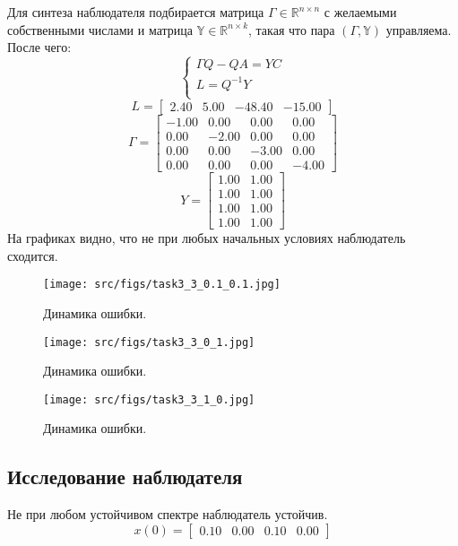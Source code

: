 Для синтеза наблюдателя подбирается матрица \(\Gamma \in \mathds{R}^{n \times n}\) с желаемыми собственными числами и матрица \(\mathds{Y} \in \mathds{R}^{n \times k}\), такая что пара \((\Gamma, \mathds{Y})\) управляема. После чего:
\[
    \begin{cases}
        \Gamma Q - QA = YC \\
        L = Q^{-1}Y \\
    \end{cases}
\]
\[L = \begin{bmatrix}
        2.40 &  5.00 & -48.40 & -15.00
      \end{bmatrix}\]
      \[\Gamma = \begin{bmatrix}
       -1.00 &  0.00 &  0.00 &  0.00\\
        0.00 & -2.00 &  0.00 &  0.00\\
        0.00 &  0.00 & -3.00 &  0.00\\
        0.00 &  0.00 &  0.00 & -4.00
      \end{bmatrix}\]
      \[Y = \begin{bmatrix}
        1.00 &  1.00\\
        1.00 &  1.00\\
        1.00 &  1.00\\
        1.00 &  1.00
      \end{bmatrix}\]
На графиках видно, что не при любых начальных условиях наблюдатель сходится.

\begin{figure}[ht!]
        \centering
        \texttt{[image: src/figs/task3\_3\_0.1\_0.1.jpg]}
        \caption{Динамика ошибки.}
        \label{fig:task3_3_0.1_0.1.jpg}
\end{figure}
\begin{figure}[ht!]
        \centering
        \texttt{[image: src/figs/task3\_3\_0\_1.jpg]}
        \caption{Динамика ошибки.}
        \label{fig:task3_3_0_1.jpg}
\end{figure}

\begin{figure}[ht!]
        \centering
        \texttt{[image: src/figs/task3\_3\_1\_0.jpg]}
        \caption{Динамика ошибки.}
        \label{fig:task3_3_1_0.jpg}
\end{figure}
\FloatBarrier

\subsection{Исследование наблюдателя}
Не при любом устойчивом спектре наблюдатель устойчив. 
\[x(0) = \begin{bmatrix}
        0.10 &  0.00 &  0.10 &  0.00
      \end{bmatrix}\]

